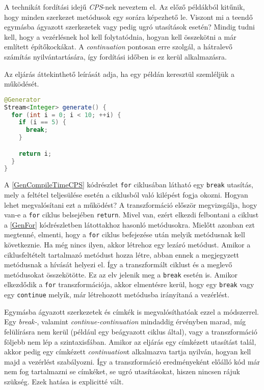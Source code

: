 A technikát fordítási idejű \textit{CPS}-nek neveztem el. Az előző példákból kitűnik, hogy minden szerkezet metódusok egy sorára képezhető le. Viszont mi a teendő egymásba ágyazott szerkezetek vagy pedig ugró utasítások esetén? Mindig tudni kell, hogy a vezérlésnek hol kell folytatódnia, hogyan kell összekötni a már említett építőkockákat. A \textit{continuation} pontosan erre szolgál, a hátralevő számítás nyilvántartására, így fordítási időben is ez kerül alkalmazásra.

Az eljárás áttekinthető leírását adja, ha egy példán keresztül szemléljük a működését.

\begin{lstlisting}[language=Java, caption={Ugró utasítást tartalmazó generátormetódus}, captionpos=b, label=GenCompileTimeCPS, escapechar=$]
@Generator
Stream<Integer> generate() {
  for (int i = 0; i < 10; ++i) {
    if (i == 5) {
      break;
    }

    return i;
  }
}
\end{lstlisting}

A \ref{GenCompileTimeCPS} kódrészlet \texttt{for} ciklusában látható egy \texttt{break} utasítás, mely a feltétel teljesülése esetén a ciklusból való kilépést fogja okozni. Hogyan lehet megvalósítani ezt a működést? A transzformáció először megvizsgálja, hogy van-e a \texttt{for} ciklus belsejében \texttt{return}. Mivel van, ezért elkezdi felbontani a ciklust a \ref{GenFor} kódrészletben látottakhoz hasonló metódusokra. Mielőtt azonban ezt megtenné, elmenti, hogy a \texttt{for} ciklus befejezése után melyik metódusnak kell következnie. Ha még nincs ilyen, akkor létrehoz egy lezáró metódust. Amikor a ciklusfeltételt tartalmazó metódust hozza létre, abban ennek a megjegyzett metódusnak a hívását helyezi el. Így a transzformált ciklust és a meglevő metódusokat összekötötte. Ez az elv jelenik meg a \texttt{break} esetén is. Amikor elkezdődik a \texttt{for} transzformációja, akkor elmentésre kerül, hogy egy \texttt{break} vagy egy \texttt{continue} melyik, már létrehozott metódusba irányítaná a vezérlést.

Egymásba ágyazott szerkezetek és címkék is megvalósíthatóak ezzel a módszerrel. Egy \textit{break-}, valamint \textit{continue-continuation} mindaddig érvényben marad, míg felülírásra nem kerül (például egy beágyazott ciklus által), vagy a transzformáció följebb nem lép a szintaxisfában. Amikor az eljárás egy címkézett utasítást talál, akkor pedig egy címkézett \textit{continuation}t alkalmazva tartja nyilván, hogyan kell majd a vezérlést szabályozni. Így a transzformáció eredményeként előálló kód már nem fog tartalmazni se címkéket, se ugró utasításokat, hiszen nincsen rájuk szükség. Ezek hatása is explicitté vált.

